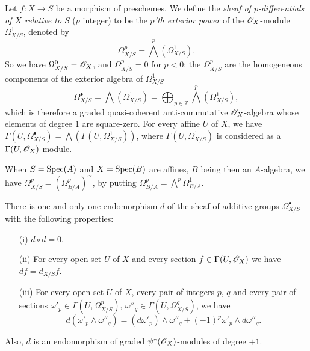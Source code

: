 \begin{env}[16.6.1]
\label{IV.16.6.1}
Let $f:X \to S$ be a morphism of preschemes.
We define the \emph{sheaf of $p$-differentials of $X$ relative to $S$} ($p$ integer) to be the \emph{$p$'th exterior power}  of the $\mathscr{O}_X$-module $\Omega_{X/S}^1$, denoted by
\[
  \label{IV.16.6.1.1}
  \Omega_{X/S}^p = \bigwedge^p(\Omega_{X/S}^1).
  \tag{16.6.1.1}
\] 
So we have $\Omega_{X/S}^0 = \mathscr{O}_X$, and $\Omega_{X/S}^p = 0$ for $p < 0$;
the $\Omega_{X/S}^p$ are the homogeneous components of the exterior algebra of $\Omega_{X/S}^1$
\[  
  \label{IV.16.6.1.2}
  \Omega_{X/S}^\bullet = \bigwedge(\Omega_{X/S}^1) = \bigoplus_{p \in \mathbb{Z}}\bigwedge^p(\Omega_{X/S}^1),  
  \tag{16.6.1.2}
\] 
which is therefore a graded quasi-coherent anti-commutative $\mathscr{O}_X$-algebra whose elements of degree $1$ are square-zero.
For every affine $U$ of $X$, we have $\Gamma(U, \Omega_{X/S}^\bullet) = \bigwedge (\Gamma(U, \Omega_{X/S}^1))$, where $\Gamma(U, \Omega_{X/S}^1)$ is considered as a $\Gamma(U, \mathscr{O}_X)$-module.

When $S = \operatorname{Spec}(A)$ and $X = \operatorname{Spec}(B)$ are affines, $B$ being then an $A$-algebra, we have  $\Omega_{X/S}^p = (\Omega_{B/A}^p)^\sim$, by putting $\Omega_{B/A}^p = \bigwedge^p\Omega^1_{B/A}$. 
\end{env}

\begin{theorem}[16.6.2]
\label{IV.16.6.2}
There is one and only one endomorphism $d$ of the sheaf of additive groups $\Omega_{X/S}^\bullet$ with the following properties:
\begin{enumerate}
  \item[\rm{(i)}] $d \circ d = 0$.
  \item[\rm{(ii)}] For every open set $U$ of $X$ and every section $f \in \Gamma(U, \mathscr{O}_X)$ we have $df = d_{X/S}f$. 
  \item[\rm{(iii)}] For every open set $U$ of $X$, every pair of integers $p$, $q$ and every pair of sections $\omega'_p \in \Gamma(U, \Omega_{X/S}^p)$, $\omega''_q \in \Gamma(U, \Omega_{X/S}^q)$, we have
  \[
    \label{IV.16.6.2.1}
    d(\omega'_p \wedge \omega''_q) = (d\omega'_p) \wedge \omega''_q + (-1)^p \omega'_p \wedge d\omega''_q.
    \tag{16.6.2.1}
  \]
\end{enumerate}
Also, $d$ is an endomorphism of graded $\psi^*(\mathscr{O}_X)$-modules of degree $+1$.
\end{theorem}

